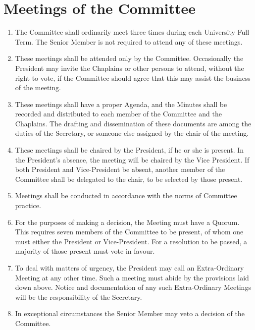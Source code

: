 \documentclass[11pt]{article}
\begin{document}
\section{Meetings of the Committee}
\begin{enumerate}
\item The Committee shall ordinarily meet three times during each University Full Term. The Senior Member is not required to attend any of these meetings.
\item These meetings shall be attended only by the Committee. Occasionally the President may invite the Chaplains or other persons to attend, without the right to vote, if the Committee should agree that this may assist the business of the meeting.
\item These meetings shall have a proper Agenda, and the Minutes shall be recorded and distributed to each member of the Committee and the Chaplains. The drafting and dissemination of these documents are among the duties of the Secretary, or someone else assigned by the chair of the meeting.
\item These meetings shall be chaired by the President, if he or she is present. In the President's absence, the meeting will be chaired by the Vice President. If both President and Vice-President be absent, another member of the Committee shall be delegated to the chair, to be selected by those present.
\item Meetings shall be conducted in accordance with the norms of Committee practice.
\item For the purposes of making a decision, the Meeting must have a Quorum. This requires seven members of the Committee to be present, of whom one must either the President or Vice-President. For a resolution to be passed, a majority of those present must vote in favour.
\item To deal with matters of urgency, the President may call an Extra-Ordinary Meeting at any other time. Such a meeting must abide by the provisions laid down above. Notice and documentation of any such Extra-Ordinary Meetings will be the responsibility of the Secretary.
\item In exceptional circumstances the Senior Member may veto a decision of the Committee. 
\end{enumerate}
\end{document}
